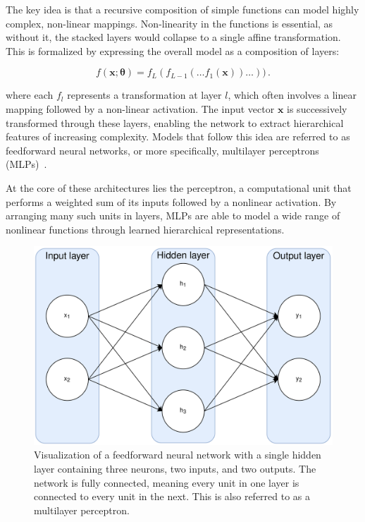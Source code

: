 The key idea is that a recursive composition of simple functions can model highly complex, non-linear mappings. Non-linearity in the functions is essential, as without it, the stacked layers would collapse to a single affine transformation. This is formalized by expressing the overall model as a composition of layers:

\begin{equation}
\label{eq:dl_recursive_feature_transform}
f(\mathbf{x}; \boldsymbol{\theta}) = f_L(f_{L-1}(\ldots f_1(\mathbf{x})) \ldots )) \,.
\end{equation}

where each $f_l$ represents a transformation at layer $l$, which often involves a linear mapping followed by a non-linear activation. The input vector $\mathbf{x}$ is successively transformed through these layers, enabling the network to extract hierarchical features of increasing complexity. Models that follow this idea are referred to as feedforward neural networks, or more specifically, multilayer perceptrons (MLPs)~\cite{lecun_deep_2015, murphy_probabilistic_2022}. 

At the core of these architectures lies the perceptron, a computational unit that performs a weighted sum of its inputs followed by a nonlinear activation. By arranging many such units in layers, MLPs are able to model a wide range of nonlinear functions through learned hierarchical representations. 

\begin{figure}
    \centering
    \includegraphics[width=0.6\linewidth]{figures/04_transformer/Shallow_NN.png}
    \caption{Visualization of a feedforward neural network with a single hidden layer containing three neurons, two inputs, and two outputs. The network is fully connected, meaning every unit in one layer is connected to every unit in the next. This is also referred to as a multilayer perceptron. }
\label{fig:shallow_NN}
\end{figure}

